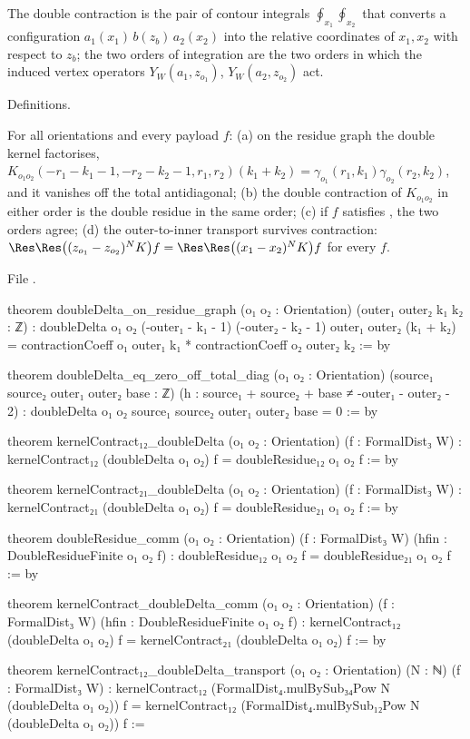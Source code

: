 \begin{physics}
The double contraction is the pair of contour integrals $\oint_{x_1}\oint_{x_2}$ that converts a configuration
$a_1(x_1)\,b(z_b)\,a_2(x_2)$ into the relative coordinates of $x_1,x_2$ with respect to $z_b$; the two orders of integration
are the two orders in which the induced vertex operators $Y_W(a_1,z_{o_1})$, $Y_W(a_2,z_{o_2})$ act.
\end{physics}

\begin{status}
Definitions.
\end{status}

\begin{theorem}\label{l01:thm:kernelresidue}
For all orientations and every payload $f$: (a) on the residue graph the double kernel factorises,
$K_{o_1o_2}(-r_1-k_1-1,-r_2-k_2-1,r_1,r_2)(k_1+k_2) = \gamma_{o_1}(r_1,k_1)\gamma_{o_2}(r_2,k_2)$, and it vanishes off the total
antidiagonal; (b) the double contraction of $K_{o_1o_2}$ in either order is the double residue in the same order;
(c) if $f$ satisfies , the two orders agree; (d) the outer-to-inner transport survives contraction:
$\Res\Res\big((z_{o_1}-z_{o_2})^NK\big)f = \Res\Res\big((x_1-x_2)^NK\big)f$ for every $f$.
\end{theorem}

\noindent File .
\begin{leancode}
theorem doubleDelta_on_residue_graph (o₁ o₂ : Orientation)
    (outer₁ outer₂ k₁ k₂ : ℤ) :
    doubleDelta o₁ o₂
        (-outer₁ - k₁ - 1) (-outer₂ - k₂ - 1) outer₁ outer₂ (k₁ + k₂) =
      contractionCoeff o₁ outer₁ k₁ * contractionCoeff o₂ outer₂ k₂ := by

theorem doubleDelta_eq_zero_off_total_diag (o₁ o₂ : Orientation)
    (source₁ source₂ outer₁ outer₂ base : ℤ)
    (h : source₁ + source₂ + base ≠ -outer₁ - outer₂ - 2) :
    doubleDelta o₁ o₂ source₁ source₂ outer₁ outer₂ base = 0 := by

theorem kernelContract₁₂_doubleDelta (o₁ o₂ : Orientation) (f : FormalDist₃ W) :
    kernelContract₁₂ (doubleDelta o₁ o₂) f = doubleResidue₁₂ o₁ o₂ f := by

theorem kernelContract₂₁_doubleDelta (o₁ o₂ : Orientation) (f : FormalDist₃ W) :
    kernelContract₂₁ (doubleDelta o₁ o₂) f = doubleResidue₂₁ o₁ o₂ f := by

theorem doubleResidue_comm (o₁ o₂ : Orientation) (f : FormalDist₃ W)
    (hfin : DoubleResidueFinite o₁ o₂ f) :
    doubleResidue₁₂ o₁ o₂ f = doubleResidue₂₁ o₁ o₂ f := by

theorem kernelContract_doubleDelta_comm (o₁ o₂ : Orientation) (f : FormalDist₃ W)
    (hfin : DoubleResidueFinite o₁ o₂ f) :
    kernelContract₁₂ (doubleDelta o₁ o₂) f =
      kernelContract₂₁ (doubleDelta o₁ o₂) f := by

theorem kernelContract₁₂_doubleDelta_transport (o₁ o₂ : Orientation) (N : ℕ)
    (f : FormalDist₃ W) :
    kernelContract₁₂ (FormalDist₄.mulBySub₃₄Pow N (doubleDelta o₁ o₂)) f =
      kernelContract₁₂ (FormalDist₄.mulBySub₁₂Pow N (doubleDelta o₁ o₂)) f :=
\end{leancode}

